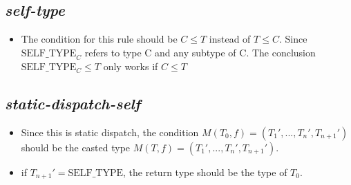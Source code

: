 \documentclass[11pt]{article}
\begin{document}
\subsection{\textit{self-type}}
\begin{itemize}
\item The condition for this rule should be $C \le T$ instead of $ T \le C $. Since $\text{SELF\_TYPE}_{C} $ refers to type C and any subtype of C. The conclusion $\text{SELF\_TYPE}_{C} \le T$ only works if $C \le T$
\end{itemize}

\subsection{\textit{static-dispatch-self}}
\begin{itemize}
\item Since this is static dispatch, the condition $M(T_{0}, f) = (T_{1}', ..., T_{n}', T_{n+1}')$ should be the casted type $M(T, f) = (T_{1}', ..., T_{n}', T_{n+1}')$.
\item if $T_{n+1}' = \text{SELF\_TYPE}$, the return type should be the type of $T_{0}$.
\end{itemize}
\end{document}
